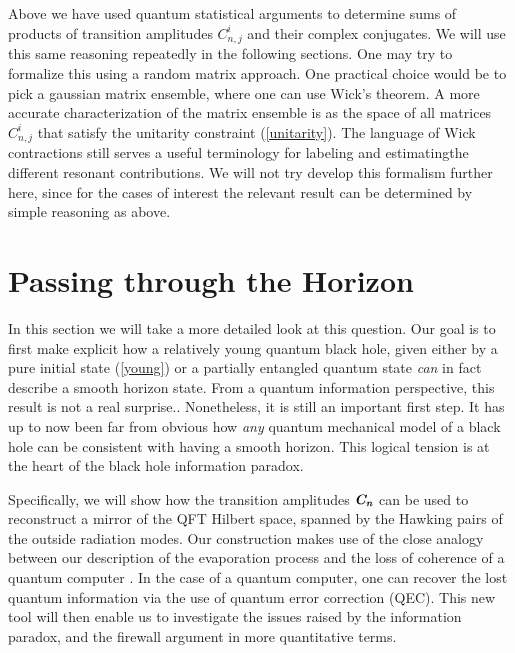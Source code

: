 \documentclass[12pt]{article}%
\begin{document}
Above we have used quantum statistical arguments to determine sums of products of transition amplitudes $C_{n,j}^i$ and their complex conjugates.
We will use this same reasoning repeatedly in the following sections. One may try to formalize this using a random matrix approach. One practical choice would
be to pick a gaussian  matrix ensemble, where one can use Wick's theorem. A more accurate characterization of the 
matrix ensemble is as the space of all  matrices $C_{n,j}^i$ that satisfy the unitarity constraint (\ref{unitarity}).
The language of Wick contractions still serves a useful terminology for labeling  and estimatingthe different resonant contributions.
 We will not try develop this formalism further here, since for the cases of interest the relevant result can be determined by simple reasoning as above.   


\section{Passing through the Horizon}

\vspace{-2mm}

In this section we will take a more detailed look at this question. Our goal is to first  make explicit 
how a relatively young quantum black hole, given either by a pure initial state (\ref{young}) or a partially entangled quantum state {\it  can} in fact describe a smooth horizon state.
From a quantum information perspective, this result is not a real surprise.. Nonetheless, it is still an important first step. It has up to 
now been far from obvious how {\it any} quantum mechanical model of a  black hole can be consistent with having a smooth horizon. 
This logical tension is at the heart of the black hole information paradox.

Specifically,  we will show how the transition amplitudes $\mbox{\textit{\textbf{C}\!\,}}_{ \textit{\textbf n}}$ can be used to reconstruct a mirror of the QFT
Hilbert space, spanned by the Hawking pairs of the outside radiation modes. Our construction makes use of the close
analogy between our description of the evaporation process and the loss of coherence of a quantum computer \cite{haydenpreskill,preskilllectures}.
In the case of a quantum computer, one can recover the lost quantum information via the use of
quantum error correction (QEC).  
This new tool will then enable us to investigate the issues raised by the information paradox, and the firewall argument in more quantitative terms.
\end{document}
